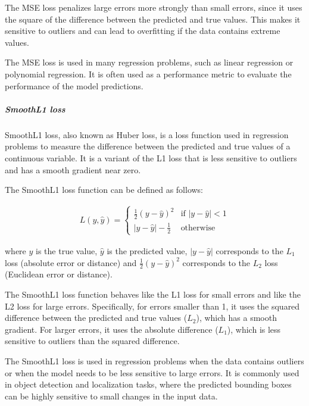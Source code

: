 The MSE loss penalizes large errors more strongly than small errors, since it uses the square of the difference between the predicted and true values. This makes it sensitive to outliers and can lead to overfitting if the data contains extreme values.

The MSE loss is used in many regression problems, such as linear regression or polynomial regression. It is often used as a performance metric to evaluate the performance of the model predictions.

\subparagraph{SmoothL1 loss}
\label{subpar:3_smoothL1_loss}

SmoothL1 loss, also known as Huber loss, is a loss function used in regression problems to measure the difference between the predicted and true values of a continuous variable. It is a variant of the L1 loss that is less sensitive to outliers and has a smooth gradient near zero.

The SmoothL1 loss function can be defined as follows:

\begin{equation}
\begin{split}
	L(y, \hat{y}) = \begin{cases}
		\frac{1}{2}(y - \hat{y})^2 & \text{if } |y - \hat{y}| < 1 \\
		|y - \hat{y}| - \frac{1}{2} & \text{otherwise} \
	\end{cases}
\end{split}
\end{equation}

where $y$ is the true value, $\hat{y}$ is the predicted value, $|y - \hat{y}|$ corresponds to the $L_1$ loss (absolute error or distance) and $\frac{1}{2}(y - \hat{y})^2$ corresponds to the $L_2$ loss (Euclidean error or distance).

The SmoothL1 loss function behaves like the L1 loss for small errors and like the L2 loss for large errors. Specifically, for errors smaller than 1, it uses the squared difference between the predicted and true values ($L_2$), which has a smooth gradient. For larger errors, it uses the absolute difference ($L_1$), which is less sensitive to outliers than the squared difference.

The SmoothL1 loss is used in regression problems when the data contains outliers or when the model needs to be less sensitive to large errors. It is commonly used in object detection and localization tasks, where the predicted bounding boxes can be highly sensitive to small changes in the input data.

